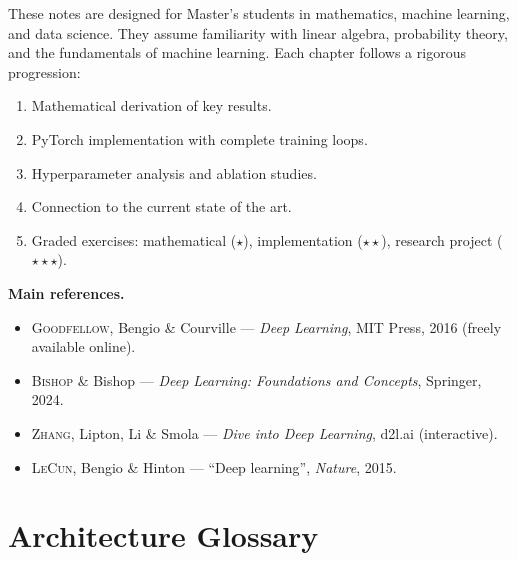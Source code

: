 \documentclass[12pt,a4paper,twoside]{book}
\theoremstyle{definition}
\theoremstyle{plain}
\theoremstyle{remark}
\begin{document}
\medskip
These notes are designed for Master's students in mathematics, machine learning, and data science. They assume familiarity with linear algebra, probability theory, and the fundamentals of machine learning. Each chapter follows a rigorous progression:
\begin{enumerate}
\item Mathematical derivation of key results.
\item PyTorch implementation with complete training loops.
\item Hyperparameter analysis and ablation studies.
\item Connection to the current state of the art.
\item Graded exercises: mathematical ($\star$), implementation ($\star\star$), research project ($\star\star\star$).
\end{enumerate}

\medskip
\textbf{Main references.}
\begin{itemize}
\item \textsc{Goodfellow}, Bengio \& Courville --- \emph{Deep Learning}, MIT Press, 2016 (freely available online).
\item \textsc{Bishop} \& Bishop --- \emph{Deep Learning: Foundations and Concepts}, Springer, 2024.
\item \textsc{Zhang}, Lipton, Li \& Smola --- \emph{Dive into Deep Learning}, d2l.ai (interactive).
\item \textsc{LeCun}, Bengio \& Hinton --- ``Deep learning'', \emph{Nature}, 2015.
\end{itemize}

\mainmatter














\backmatter
\appendix
\chapter{Architecture Glossary}
\label{app:glossary}
\end{document}
